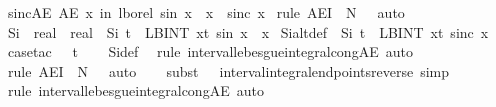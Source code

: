 \documentclass[leqno]{article}
\theoremstyle{definition}
\begin{document}
\begin{isabellebody}
\isanewline
{}\isamarkupfalse%
\ sinc{\isacharunderscore}AE{\isacharcolon}\ {\isachardoublequoteopen}AE\ x\ in\ lborel{\isachardot}\ sin\ x\ {\isacharslash}\ x\ {\isacharequal}\ sinc\ x{\isachardoublequoteclose}\isanewline
{}\isamarkupfalse%
\ {\isacharparenleft}rule\ AE{\isacharunderscore}I\ {\isacharbrackleft}\ N\ {\isacharequal}\ {\isachardoublequoteopen}{\isacharbraceleft}{}{\isacharbraceright}{\isachardoublequoteclose}{\isacharbrackright}{\isacharcomma}\ auto{\isacharparenright}%
\isanewline
{}\isamarkupfalse%
\ Si\ {\isacharcolon}{\isacharcolon}\ {\isachardoublequoteopen}real\ {\isasymRightarrow}\ real{\isachardoublequoteclose}\ \ {\isachardoublequoteopen}Si\ t\ {\isasymequiv}\ LBINT\ x{\isacharequal}{}{\isachardot}{\isachardot}t{\isachardot}\ sin\ x\ {\isacharslash}\ x{\isachardoublequoteclose}\isanewline
\isanewline
\isanewline
\isanewline
{}\isamarkupfalse%
\ Si{\isacharunderscore}alt{\isacharunderscore}def\ {\isacharcolon}\ {\isachardoublequoteopen}Si\ t\ {\isacharequal}\ LBINT\ x{\isacharequal}{}{\isachardot}{\isachardot}t{\isachardot}\ sinc\ x{\isachardoublequoteclose}\isanewline
{}\isamarkupfalse%
\ {\isacharparenleft}case{\isacharunderscore}tac\ {\isachardoublequoteopen}{}\ {\isasymle}\ t{\isachardoublequoteclose}{\isacharparenright}\isanewline
\ \ \isamarkupfalse%
\ Si{\isacharunderscore}def\ \isamarkupfalse%
\ {\isacharparenleft}rule\ interval{\isacharunderscore}lebesgue{\isacharunderscore}integral{\isacharunderscore}cong{\isacharunderscore}AE{\isacharcomma}\ auto{\isacharparenright}\isanewline
\ \ \isamarkupfalse%
\ {\isacharparenleft}rule\ AE{\isacharunderscore}I{\isacharprime}\ {\isacharbrackleft}\ N\ {\isacharequal}\ {\isachardoublequoteopen}{\isacharbraceleft}{}{\isacharbraceright}{\isachardoublequoteclose}{\isacharbrackright}{\isacharcomma}\ auto{\isacharparenright}\isanewline
\ \ \isamarkupfalse%
\ {\isacharparenleft}subst\ {\isacharparenleft}{}\ {}{\isacharparenright}\ interval{\isacharunderscore}integral{\isacharunderscore}endpoints{\isacharunderscore}reverse{\isacharcomma}\ simp{\isacharparenright}\isanewline
\ \ \isamarkupfalse%
\ {\isacharparenleft}rule\ interval{\isacharunderscore}lebesgue{\isacharunderscore}integral{\isacharunderscore}cong{\isacharunderscore}AE{\isacharcomma}\ auto{\isacharparenright}\isanewline
{}\isamarkupfalse%

\end{isabellebody}
\end{document}
